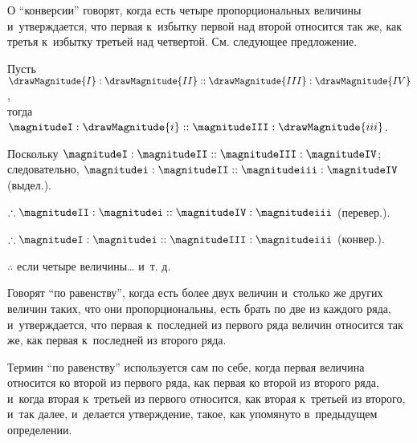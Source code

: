\documentclass[letters,booklanguage=russian]{byrnebook}
\begin{document}
\label{def:V.XVII} %
О \enquote{конверсии} говорят, когда есть четыре пропорциональных величины и~утверждается, что первая к~избытку первой над второй относится так же, как третья к~избытку третьей над четвертой. См. следующее предложение.

\vfill\pagebreak

\label{prop:V.E}

\begin{center}
Пусть $\drawMagnitude{I} : \drawMagnitude{II} :: \drawMagnitude{III} : \drawMagnitude{IV}$,\\
тогда $\magnitudeI : \drawMagnitude{i} :: \magnitudeIII : \drawMagnitude{iii}$.

Поскольку $\magnitudeI : \magnitudeII :: \magnitudeIII : \magnitudeIV$;\\
следовательно, $\magnitudei : \magnitudeII :: \magnitudeiii : \magnitudeIV$ (выдел.).

$\therefore \magnitudeII : \magnitudei :: \magnitudeIV : \magnitudeiii$ (перевер.).

$\therefore \magnitudeI : \magnitudei :: \magnitudeIII : \magnitudeiii$ (конвер.).

$\therefore$ если четыре величины… и~т. д.
\end{center}

\label{def:V.XVIII}
Говорят \enquote{по равенству}, когда есть более двух величин и~столько же других величин таких, что они пропорциональны, есть брать по две из каждого ряда, и~утверждается, что первая к~последней из первого ряда величин относится так же, как первая к~последней из второго ряда.

\vfill\pagebreak

\label{def:V.XIX}
\def\varA{\textcolor{byred}{A}}
\def\varB{\textcolor{byred}{B}}
\def\varC{\textcolor{byyellow}{C}}
\def\varD{\textcolor{byyellow}{D}}
\def\varE{\textcolor{byblue}{E}}
\def\varF{\textcolor{byblue}{F}}
\def\varL{\textcolor{byred}{L}}
\def\varM{\textcolor{byred}{M}}
\def\varN{\textcolor{byyellow}{N}}
\def\varO{\textcolor{byyellow}{O}}
\def\varP{\textcolor{byblue}{P}}
\def\varQ{\textcolor{byblue}{Q}}
Термин \enquote{по равенству} используется сам по себе, когда первая величина относится ко второй из первого ряда, как первая ко второй из второго ряда, и~когда вторая к~третьей из первого относится, как вторая к~третьей из второго, и~так далее, и~делается утверждение, такое, как упомянуто в~предыдущем определении.
\end{document}
